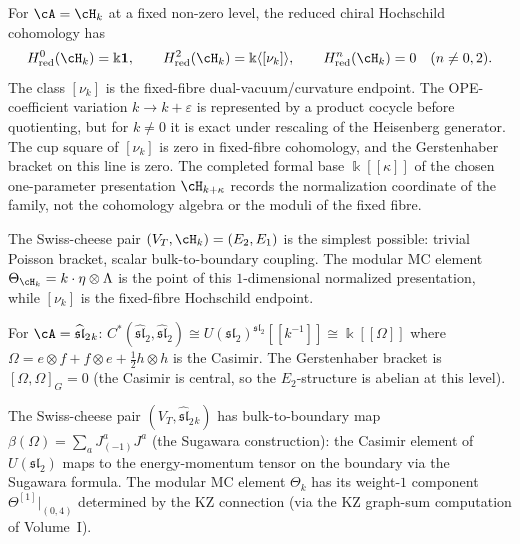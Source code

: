\begin{computation}
\label{comp:tamarkin-e2-heisenberg}
For $\cA=\cH_k$ at a fixed non-zero level, the reduced chiral
Hochschild cohomology has
\[
H^0_{\mathrm{red}}(\cH_k)=\Bbbk\mathbf 1,\qquad
H^2_{\mathrm{red}}(\cH_k)=
\Bbbk\langle[\nu_k]\rangle,\qquad
H^n_{\mathrm{red}}(\cH_k)=0\quad(n\ne 0,2).
\]
The class $[\nu_k]$ is the fixed-fibre dual-vacuum/curvature
endpoint.  The OPE-coefficient variation
$k\to k+\varepsilon$ is represented by a product cocycle before
quotienting, but for $k\neq0$ it is exact under rescaling of the
Heisenberg generator. The cup square of $[\nu_k]$ is zero in
fixed-fibre cohomology, and the Gerstenhaber bracket on this line is
zero. The completed formal base $\Bbbk[[\kappa]]$ of the chosen
one-parameter presentation $\cH_{k+\kappa}$ records the normalization
coordinate of the family, not the cohomology algebra or the moduli of
the fixed fibre.

The Swiss-cheese pair $(V_T,\cH_k)=(E_2,E_1)$ is the
simplest possible: trivial Poisson bracket, scalar
bulk-to-boundary coupling. The modular MC element
$\Theta_{\cH_k}=k\cdot\eta\otimes\Lambda$ is the point of this
$1$-dimensional normalized presentation, while $[\nu_k]$ is the
fixed-fibre Hochschild endpoint.
\end{computation}

\begin{computation}
\label{comp:tamarkin-e2-sl2}
For $\cA=\widehat{\mathfrak{sl}}_2{}_k$:
$C^*(\widehat{\mathfrak{sl}}_2,\widehat{\mathfrak{sl}}_2)
\cong U(\mathfrak{sl}_2)^{\mathfrak{sl}_2}[\![k^{-1}]\!]
\cong\Bbbk[[\Omega]]$
where $\Omega=e\otimes f+f\otimes e+\tfrac12 h\otimes h$
is the Casimir. The Gerstenhaber bracket is
$[\Omega,\Omega]_G=0$ (the Casimir is central, so the
$E_2$-structure is abelian at this level).

The Swiss-cheese pair
$(V_T,\widehat{\mathfrak{sl}}_2{}_k)$ has
bulk-to-boundary map
$\beta(\Omega)=\sum_a J^a_{(-1)}J^a$
(the Sugawara construction): the Casimir element of
$U(\mathfrak{sl}_2)$ maps to the energy-momentum tensor
on the boundary via the Sugawara formula. The modular MC
element $\Theta_k$ has its weight-$1$ component
$\Theta^{[1]}|_{(0,4)}$ determined by the KZ connection
(via the KZ graph-sum computation of Volume~I).
\end{computation}

